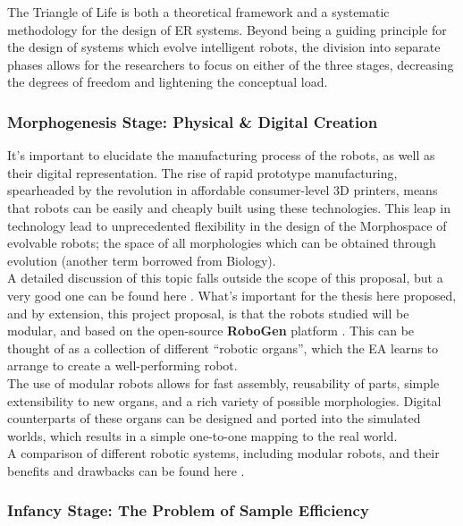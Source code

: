 \documentclass{scrartcl}
\begin{document}
The Triangle of Life is both a theoretical framework and a systematic methodology for the design of ER systems.
Beyond being a guiding principle for the design of systems which evolve intelligent robots, the division into separate phases allows for the researchers to focus on either of the three stages, decreasing the degrees of freedom and lightening the conceptual load.

\subsubsection{Morphogenesis Stage: Physical \& Digital Creation}

It's important to elucidate the manufacturing process of the robots, as well as their digital representation.
The rise of rapid prototype manufacturing, spearheaded by the revolution in affordable consumer-level 3D printers, means that robots can be easily and cheaply built using these technologies.
This leap in technology lead to unprecedented flexibility in the design of the Morphospace of evolvable robots; the space of all morphologies which can be obtained through evolution (another term borrowed from Biology). \\

A detailed discussion of this topic falls outside the scope of this proposal, but a very good one can be found here \cite{Moreno2020}.
What's important for the thesis here proposed, and by extension, this project proposal, is that the robots studied will be modular, and based on the open-source \textbf{RoboGen} platform \cite{Auerbach2014}.
This can be thought of as a collection of different ``robotic organs'', which the EA learns to arrange to create a well-performing robot. \\

The use of modular robots allows for fast assembly, reusability of parts, simple extensibility to new organs, and a rich variety of possible morphologies.
Digital counterparts of these organs can be designed and ported into the simulated worlds, which results in a simple one-to-one mapping to the real world.\\

A comparison of different robotic systems, including modular robots, and their benefits and drawbacks can be found here \cite{Jelisavcic2017}.

\subsubsection{Infancy Stage: The Problem of Sample Efficiency}
\end{document}
